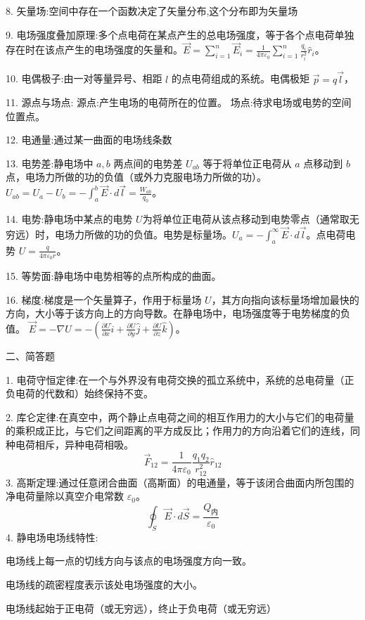 \documentclass{article}
\begin{document}
 8. 矢量场:空间中存在一个函数决定了矢量分布,这个分布即为矢量场

 9. 电场强度叠加原理:多个点电荷在某点产生的总电场强度，等于各个点电荷单独存在时在该点产生的电场强度的矢量和。$ \vec{E} = \sum_{i=1}^n \vec{E}_i = \frac{1}{4\pi\varepsilon_0} \sum_{i=1}^n \frac{q_i}{r_i^2} \hat{r}_i $。

 10. 电偶极子:由一对等量异号、相距 $ l $ 的点电荷组成的系统。电偶极矩 $ \vec{p} = q \vec{l} $，

 11. 源点与场点:
源点:产生电场的电荷所在的位置。
场点:待求电场或电势的空间位置点。


 12. 电通量:通过某一曲面的电场线条数

 13. 电势差:静电场中 $ a, b $ 两点间的电势差 $ U_{ab} $ 等于将单位正电荷从 $ a $ 点移动到 $ b $ 点，电场力所做的功的负值（或外力克服电场力所做的功）。$ U_{ab} = U_a - U_b = -\int_a^b \vec{E} \cdot d\vec{l} = \frac{W_{ab}}{q_0} $。

 14. 电势:静电场中某点的电势 $ U $为将单位正电荷从该点移动到电势零点（通常取无穷远）时，电场力所做的功的负值。电势是标量场。$ U_a = -\int_a^{\infty} \vec{E} \cdot d\vec{l} $。点电荷电势 $ U = \frac{q}{4\pi\varepsilon_0 r} $。

 15. 等势面:静电场中电势相等的点所构成的曲面。

 16. 梯度:梯度是一个矢量算子，作用于标量场 $ U $，其方向指向该标量场增加最快的方向，大小等于该方向上的方向导数。在静电场中，电场强度等于电势梯度的负值。
$ \vec{E} = -\nabla U = -\left( \frac{\partial U}{\partial x} \hat{i} + \frac{\partial U}{\partial y} \hat{j} + \frac{\partial U}{\partial z} \hat{k} \right) $。


\newpage
 二、简答题

 1. 电荷守恒定律:在一个与外界没有电荷交换的孤立系统中，系统的总电荷量（正负电荷的代数和）始终保持不变。

 2. 库仑定律:在真空中，两个静止点电荷之间的相互作用力的大小与它们的电荷量的乘积成正比，与它们之间距离的平方成反比；作用力的方向沿着它们的连线，同种电荷相斥，异种电荷相吸。
$$
\vec{F}_{12} = \frac{1}{4\pi\varepsilon_0} \frac{q_1 q_2}{r_{12}^2} \hat{r}_{12}
$$
 3. 高斯定理:通过任意闭合曲面（高斯面）的电通量，等于该闭合曲面内所包围的净电荷量除以真空介电常数 $ \varepsilon_0 $。
$$
\oint_S \vec{E} \cdot d\vec{S} = \frac{Q_{\text{内}}}{\varepsilon_0}
$$
 4. 静电场电场线特性:

电场线上每一点的切线方向与该点的电场强度方向一致。

电场线的疏密程度表示该处电场强度的大小。

电场线起始于正电荷（或无穷远），终止于负电荷（或无穷远）
\end{document}
